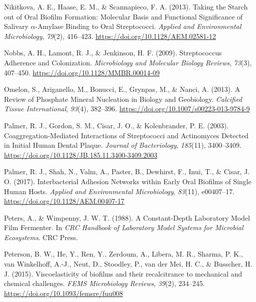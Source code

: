 \documentclass[
  b5paper,
]{book}
\newlength{\cslhangindent}
\newenvironment{CSLReferences}[2] %
 {\begin{list}{}{%
  \setlength{\itemindent}{0pt}
  \setlength{\leftmargin}{0pt}
  \setlength{\parsep}{0pt}
  \ifodd #1
   \setlength{\leftmargin}{\cslhangindent}
   \setlength{\itemindent}{-1\cslhangindent}
  \fi
  \setlength{\itemsep}{#2\baselineskip}}}
 {\end{list}}
\begin{document}
\begin{CSLReferences}{1}{0}
Nikitkova, A. E., Haase, E. M., \& Scannapieco, F. A. (2013). Taking the
{Starch} out of {Oral Biofilm Formation}: {Molecular Basis} and
{Functional Significance} of {Salivary} {\(\alpha\)}-{Amylase Binding}
to {Oral Streptococci}. \emph{Applied and Environmental Microbiology},
\emph{79}(2), 416--423. \url{https://doi.org/10.1128/AEM.02581-12}

Nobbs, A. H., Lamont, R. J., \& Jenkinson, H. F. (2009). Streptococcus
{Adherence} and {Colonization}. \emph{Microbiology and Molecular Biology
Reviews}, \emph{73}(3), 407--450.
\url{https://doi.org/10.1128/MMBR.00014-09}

Omelon, S., Ariganello, M., Bonucci, E., Grynpas, M., \& Nanci, A.
(2013). A {Review} of {Phosphate Mineral Nucleation} in {Biology} and
{Geobiology}. \emph{Calcified Tissue International}, \emph{93}(4),
382--396. \url{https://doi.org/10.1007/s00223-013-9784-9}

Palmer, R. J., Gordon, S. M., Cisar, J. O., \& Kolenbrander, P. E.
(2003). Coaggregation-{Mediated Interactions} of {Streptococci} and
{Actinomyces Detected} in {Initial Human Dental Plaque}. \emph{Journal
of Bacteriology}, \emph{185}(11), 3400--3409.
\url{https://doi.org/10.1128/JB.185.11.3400-3409.2003}

Palmer, R. J., Shah, N., Valm, A., Paster, B., Dewhirst, F., Inui, T.,
\& Cisar, J. O. (2017). Interbacterial {Adhesion Networks} within {Early
Oral Biofilms} of {Single Human Hosts}. \emph{Applied and Environmental
Microbiology}, \emph{83}(11), e00407--17.
\url{https://doi.org/10.1128/AEM.00407-17}

Peters, A., \& Wimpenny, J. W. T. (1988). A {Constant-Depth Laboratory
Model Film Fermenter}. In \emph{{CRC Handbook} of {Laboratory Model
Systems} for {Microbial Ecosystems}}. {CRC Press}.

Peterson, B. W., He, Y., Ren, Y., Zerdoum, A., Libera, M. R., Sharma, P.
K., van Winkelhoff, A.-J., Neut, D., Stoodley, P., van der Mei, H. C.,
\& Busscher, H. J. (2015). Viscoelasticity of biofilms and their
recalcitrance to mechanical and chemical challenges. \emph{FEMS
Microbiology Reviews}, \emph{39}(2), 234--245.
\url{https://doi.org/10.1093/femsre/fuu008}


\end{CSLReferences}
\end{document}
